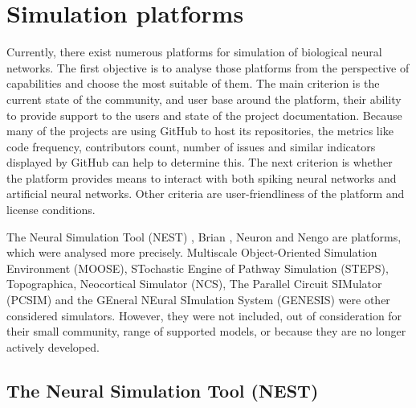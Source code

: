 \chapter{Simulation platforms} \label{chap:03}

Currently, there exist numerous platforms for simulation of biological neural networks. The first objective is to analyse those platforms from the perspective of capabilities and choose the most suitable of them. The main criterion is the current state of the community, and user base around the platform, their ability to provide support to the users and state of the project documentation. Because many of the projects are using GitHub to host its repositories, the metrics like code frequency, contributors count, number of issues and similar indicators displayed by GitHub can help to determine this. The next criterion is whether the platform provides means to interact with both spiking neural networks and artificial neural networks. Other criteria are user-friendliness of the platform and license conditions. \par
The Neural Simulation Tool (NEST) \cite{jordanNEST182019}, Brian \cite{stimbergBrianIntuitiveEfficient2019}, Neuron \cite{carnevaleNEURONBook06} and Nengo \cite{bekolayNengoPythonTool2014} are platforms, which were analysed more precisely. Multiscale Object-Oriented Simulation Environment (MOOSE), STochastic Engine of Pathway Simulation (STEPS), Topographica, Neocortical Simulator (NCS), The Parallel Circuit SIMulator (PCSIM) and the GEneral NEural SImulation System (GENESIS) were other considered simulators. However, they were not included, out of consideration for their small community, range of supported models, or because they are no longer actively developed.

\section{The Neural Simulation Tool (NEST)}

